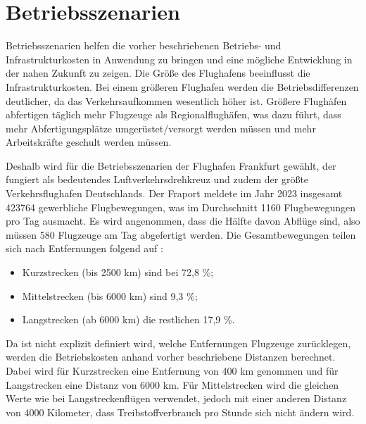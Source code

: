 
\section{Betriebsszenarien}
\label{s:Betriebsszenarien}
Betriebsszenarien helfen die vorher beschriebenen Betriebs- und Infrastrukturkosten in Anwendung zu bringen 
und eine mögliche Entwicklung in der nahen Zukunft zu zeigen. 
Die Größe des Flughafens beeinflusst die Infrastrukturkosten. 
Bei einem größeren Flughafen werden die Betriebsdifferenzen deutlicher, da das Verkehrsaufkommen wesentlich höher ist.
Größere Flughäfen abfertigen täglich mehr Flugzeuge als Regionalflughäfen, 
was dazu führt, dass mehr Abfertigungsplätze umgerüstet/versorgt werden müssen und mehr Arbeitskräfte geschult werden müssen.

Deshalb wird für die Betriebsszenarien der Flughafen Frankfurt gewählt, der fungiert als bedeutendes Luftverkehrsdrehkreuz
und zudem der größte Verkehrsflughafen Deutschlands.
Der Fraport meldete im Jahr 2023 insgesamt 423764 gewerbliche Flugbewegungen, was im Durchschnitt 1160 Flugbewegungen pro Tag ausmacht. 
Es wird angenommen, dass die Hälfte davon Abflüge sind, also müssen 580 Flugzeuge am Tag abgefertigt werden.
%
Die Gesamtbewegungen teilen sich nach Entfernungen folgend auf \cite{fraport2023frankfurt}:
\begin{itemize}
    \item Kurzstrecken (bis 2500 km) sind bei 72,8 \%;
    \item Mittelstrecken (bis 6000 km) sind 9,3 \%;
    \item Langstrecken (ab 6000 km) die restlichen 17,9 \%. 
    \end{itemize}
Da ist nicht explizit definiert wird, welche Entfernungen Flugzeuge zurücklegen, werden die Betriebskosten anhand vorher beschriebene Distanzen berechnet.
Dabei wird für Kurzstrecken eine Entfernung von 400 km genommen und für Langstrecken eine Distanz von 6000 km.
Für Mittelstrecken wird die gleichen Werte wie bei Langstreckenflügen verwendet, jedoch mit einer anderen Distanz von 4000 Kilometer,
dass Treibstoffverbrauch pro Stunde sich nicht ändern wird.

